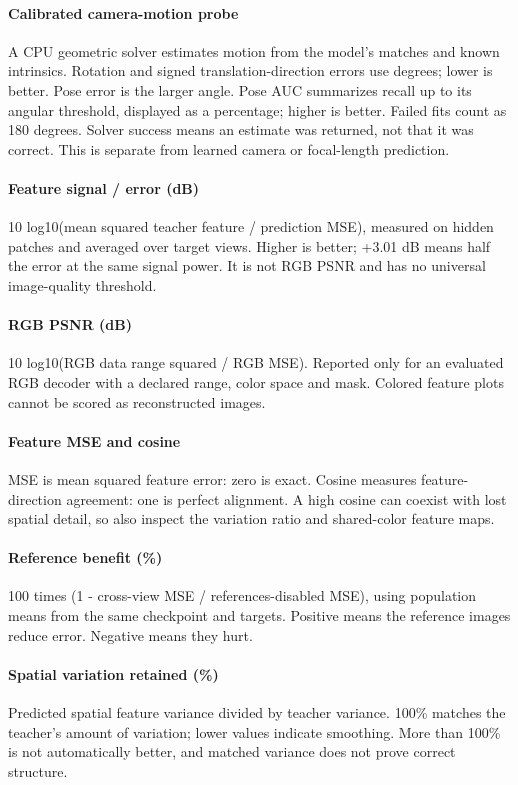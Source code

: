 \documentclass[10pt]{article}
\begin{document}
\paragraph{Calibrated camera-motion probe} A CPU geometric solver estimates motion from the model's matches and known intrinsics. Rotation and signed translation-direction errors use degrees; lower is better. Pose error is the larger angle. Pose AUC summarizes recall up to its angular threshold, displayed as a percentage; higher is better. Failed fits count as 180 degrees. Solver success means an estimate was returned, not that it was correct. This is separate from learned camera or focal-length prediction.
\paragraph{Feature signal / error (dB)} 10 log10(mean squared teacher feature / prediction MSE), measured on hidden patches and averaged over target views. Higher is better; +3.01 dB means half the error at the same signal power. It is not RGB PSNR and has no universal image-quality threshold.
\paragraph{RGB PSNR (dB)} 10 log10(RGB data range squared / RGB MSE). Reported only for an evaluated RGB decoder with a declared range, color space and mask. Colored feature plots cannot be scored as reconstructed images.
\paragraph{Feature MSE and cosine} MSE is mean squared feature error: zero is exact. Cosine measures feature-direction agreement: one is perfect alignment. A high cosine can coexist with lost spatial detail, so also inspect the variation ratio and shared-color feature maps.
\paragraph{Reference benefit (\%)} 100 times (1 - cross-view MSE / references-disabled MSE), using population means from the same checkpoint and targets. Positive means the reference images reduce error. Negative means they hurt.
\paragraph{Spatial variation retained (\%)} Predicted spatial feature variance divided by teacher variance. 100\% matches the teacher's amount of variation; lower values indicate smoothing. More than 100\% is not automatically better, and matched variance does not prove correct structure.
\end{document}
